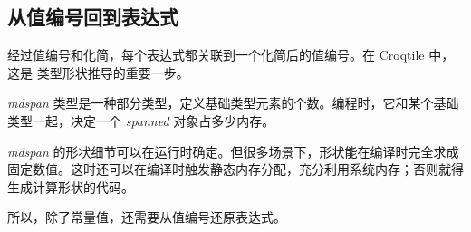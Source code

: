 \subsection*{从值编号回到表达式}

经过值编号和化简，每个表达式都关联到一个化简后的值编号。在 Croqtile 中，这是 \co@mdspan@ 类型形状推导的重要一步。

\emph{mdspan} 类型是一种部分类型，定义基础类型元素的个数。编程时，它和某个基础类型一起，决定一个 \emph{spanned} 对象占多少内存。

\emph{mdspan} 的形状细节可以在运行时确定。但很多场景下，形状能在编译时完全求成固定数值。这时还可以在编译时触发静态内存分配，充分利用系统内存；否则就得生成计算形状的代码。

所以，除了常量值，还需要从值编号还原表达式。
